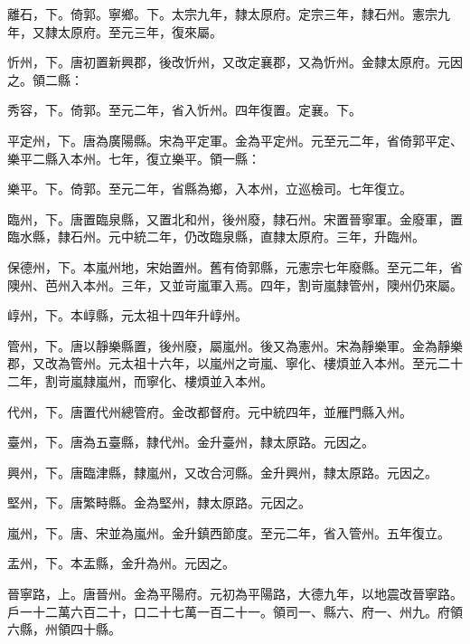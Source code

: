 \begin{pinyinscope}
 離石，下。倚郭。寧鄉。下。太宗九年，隸太原府。定宗三年，隸石州。憲宗九年，又隸太原府。至元三年，復來屬。



 忻州，下。唐初置新興郡，後改忻州，又改定襄郡，又為忻州。金隸太原府。元因之。領二縣：



 秀容，下。倚郭。至元二年，省入忻州。四年復置。定襄。下。



 平定州，下。唐為廣陽縣。宋為平定軍。金為平定州。元至元二年，省倚郭平定、樂平二縣入本州。七年，復立樂平。領一縣：



 樂平。下。倚郭。至元二年，省縣為鄉，入本州，立巡檢司。七年復立。



 臨州，下。唐置臨泉縣，又置北和州，後州廢，隸石州。宋置晉寧軍。金廢軍，置臨水縣，隸石州。元中統二年，仍改臨泉縣，直隸太原府。三年，升臨州。



 保德州，下。本嵐州地，宋始置州。舊有倚郭縣，元憲宗七年廢縣。至元二年，省隩州、芭州入本州。三年，又並岢嵐軍入焉。四年，割岢嵐隸管州，隩州仍來屬。



 崞州，下。本崞縣，元太祖十四年升崞州。



 管州，下。唐以靜樂縣置，後州廢，屬嵐州。後又為憲州。宋為靜樂軍。金為靜樂郡，又改為管州。元太祖十六年，以嵐州之岢嵐、寧化、樓煩並入本州。至元二十二年，割岢嵐隸嵐州，而寧化、樓煩並入本州。



 代州，下。唐置代州總管府。金改都督府。元中統四年，並雁門縣入州。



 臺州，下。唐為五臺縣，隸代州。金升臺州，隸太原路。元因之。



 興州，下。唐臨津縣，隸嵐州，又改合河縣。金升興州，隸太原路。元因之。



 堅州，下。唐繁畤縣。金為堅州，隸太原路。元因之。



 嵐州，下。唐、宋並為嵐州。金升鎮西節度。至元二年，省入管州。五年復立。



 盂州，下。本盂縣，金升為州。元因之。



 晉寧路，上。唐晉州。金為平陽府。元初為平陽路，大德九年，以地震改晉寧路。戶一十二萬六百二十，口二十七萬一百二十一。領司一、縣六、府一、州九。府領六縣，州領四十縣。




\end{pinyinscope}
